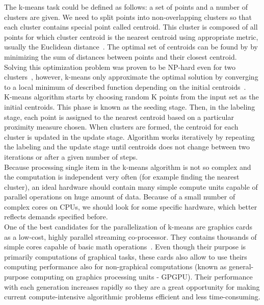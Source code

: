 The k-means task could be defined as follows: a set of points and a number of clusters are given. We need to split points into non-overlapping clusters so that each cluster contains special point called centroid. This cluster is composed of all points for which cluster centroid is the nearest centroid using appropriate metric, usually the Euclidean distance~\cite{Zechner09}. The optimal set of centroids can be found by by minimizing the sum of distances between points and their closest centroid. Solving this optimization problem was proven to be NP-hard even for two clusters~\cite{Drineas04}, however, k-means only approximate the optimal solution by converging to a local minimum of described function depending on the initial centroids~\cite{Bottou95}. \\

K-means algorithm starts by choosing random K points from the input set as the initial centroids. This phase is known as the seeding stage.
Then, in the labeling stage, each point is assigned to the nearest centroid based on a particular proximity measure chosen.
When clusters are formed, the centroid for each cluster is updated in the update stage.
Algorithm works iteratively by repeating the labeling and the update stage until centroids does not change between two iterations or after a given number of steps.\\

Because processing single item in the k-means algorithm is not so complex and the computation is independent very often (for example finding the nearest cluster), an ideal hardware should contain many simple compute units capable of parallel operations on huge amount of data. Because of a small number of complex cores on CPUs, we should look for some specific hardware, which better reflects demands specified before.\\
One of the best candidates for the parallelization of k-means are graphics cards as a low-cost, highly parallel streaming co-processor. They contains thousands of simple cores capable of basic math operations~\cite{Zechner09}. Even though their purpose is primarily computations of graphical tasks, these cards also allow to use theirs computing performance also for non-graphical computations (known as general-purpose computing on graphics processing units - GPGPU). Their performance with each generation increases rapidly so they are a great opportunity for making current compute-intensive algorithmic problems efficient and less time-consuming.\\

